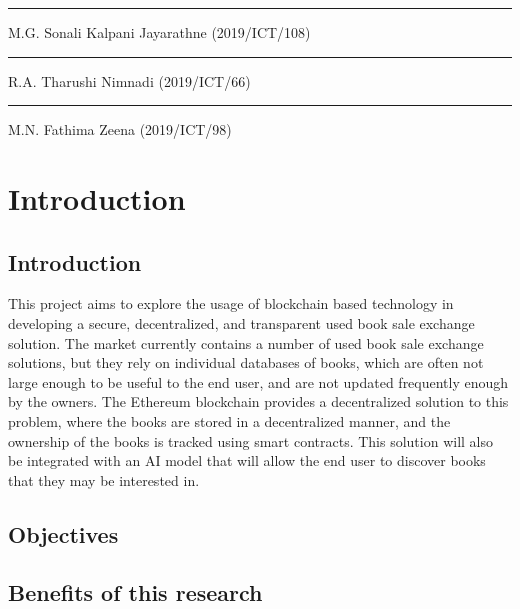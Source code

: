 \documentclass{article}
\begin{document}
\vspace{2cm} %
\rule{5cm}{0.5pt} %
\linebreak
M.G. Sonali Kalpani Jayarathne (2019/ICT/108)

\vspace{2cm} %
\rule{5cm}{0.5pt} %
\linebreak
R.A. Tharushi Nimnadi (2019/ICT/66)

\vspace{2cm} %
\rule{5cm}{0.5pt} %
\linebreak
M.N. Fathima Zeena (2019/ICT/98)

\newpage

\tableofcontents
\newpage

\section{Introduction}
\subsection{Introduction}
This project aims to explore the usage of blockchain based technology in developing
a secure, decentralized, and transparent used book sale exchange solution. The market
currently contains a number of used book sale exchange solutions, but they rely on
individual databases of books, which are often not large enough to be useful to the
end user, and are not updated frequently enough by the owners. The Ethereum blockchain
provides a decentralized solution to this problem, where the books are stored in a
decentralized manner, and the ownership of the books is tracked using smart contracts.
This solution will also be integrated with an AI model that will allow the end user to
discover books that they may be interested in.

\subsection{Objectives}


\subsection{Benefits of this research}

\end{document}
